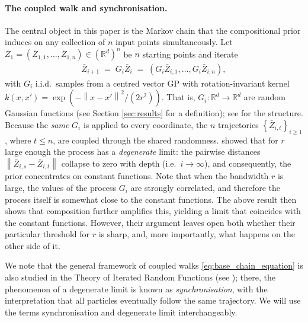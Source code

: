 \documentclass{article}
\newcommand{\RR}{\mathbb{R}}
\newcommand{\Set}[1]{\left\{ #1 \right\}}
\newcommand{\norm}[1]{\left\|#1\right\|}
\newcommand{\bZ}{\bar{Z}}
\begin{document}
\paragraph{The coupled walk and synchronisation.}
The central object in this paper is the Markov chain that the compositional prior induces on any collection of $n$ input points simultaneously. Let $\bZ_1 = (\bZ_{1,1},\ldots,\bZ_{1,n}) \in (\RR^d)^n$ be $n$ starting points and iterate
\begin{eqnarray}
  \label{eq:base_chain_equation}
  \bZ_{i+1} \;=\; G_i \bZ_i \;=\; (G_i \bZ_{i,1}, \ldots, G_i \bZ_{i,n}),
\end{eqnarray}
with $G_i$ i.i.d.\ samples from a centred vector GP with rotation-invariant kernel $k(x,x') = \exp(-\norm{x-x'}^2 / (2 r^2))$. That is, $G_i:\RR^d \rightarrow \RR^d$ are random Gaussian functions (see Section \ref{sec:results} for a definition); see  for the structure.
Because the \emph{same} $G_i$ is applied to every coordinate, the $n$ trajectories $\Set{\bZ_{i,t}}_{i \ge 1}$, where $t\leq n$, are coupled through the shared randomness. \citet{dunlop2018how} showed that for $r$ large enough the process has a \emph{degenerate} limit: the pairwise distances $\norm{\bZ_{i,s} - \bZ_{i,t}}$ collapse to zero with depth (i.e.\ $i \rightarrow \infty$), and consequently, the prior concentrates on constant functions. Note that when the bandwidth $r$ is large, the values of the process $G_i$ are strongly correlated, and therefore the process itself is somewhat close to the constant functions. The above result then shows that composition further amplifies this, yielding a limit that coincides with the constant functions. 
 However, their argument leaves open both whether their particular  threshold for $r$ is sharp, and, more importantly, what happens on the other side of it. 
 
 
 We note that the general framework of coupled walks \eqref{eq:base_chain_equation} is
 also studied in the Theory of Iterated Random Functions (see ); there, the phenomenon of a degenerate limit is known as \emph{synchronisation}, with the interpretation that all particles eventually follow the same trajectory. We will use the terms synchronisation and degenerate limit interchangeably.
\end{document}
